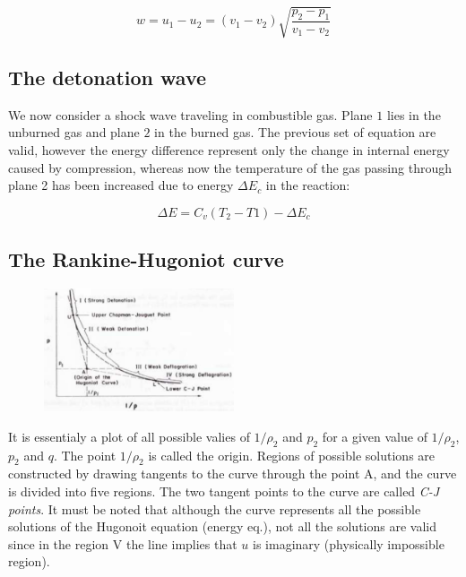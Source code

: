 \documentclass[12pt]{article}
\begin{document}
\begin{equation}
    w=u_{1}-u_{2}= (v_{1}-v_{2})\sqrt{\frac{p_{2}-p_{1}}{v_{1}-v_{2}}}
\end{equation}

\subsection{The detonation wave}

We now consider a shock wave traveling in combustible gas. Plane $1$ lies in the unburned gas and plane $2$ in the burned gas. The previous set of equation are valid, however the energy difference represent only the change in internal energy caused by compression, whereas now the temperature of the gas passing through plane 2 has been increased due to energy $\Delta E_{c}$ in the reaction:

\begin{equation}
    \Delta E = C_{v}(T_{2}-T{1}) - \Delta E_{c}
\end{equation}

\subsection{The Rankine-Hugoniot curve}

\begin{figure}[!ht]
\centering
\includegraphics[width=0.5\textwidth]{figures/rankine.png}
\end{figure}

It is essentialy a plot of all possible valies of $1/\rho_{2}$ and $p_{2}$ for a given value of $1/\rho_{2}$, $p_{2}$ and $q$. The point $1/\rho_{2}$ is called the origin. Regions of possible solutions are constructed by drawing tangents to the curve through the point A, and the curve is divided into five regions. The two tangent points to the curve are called \textit{C-J points}. It must be noted that although the curve represents all the possible solutions of the Hugonoit equation (energy eq.), not all the solutions are valid since in the region V the line implies that $u$ is imaginary (physically impossible region).
\end{document}
